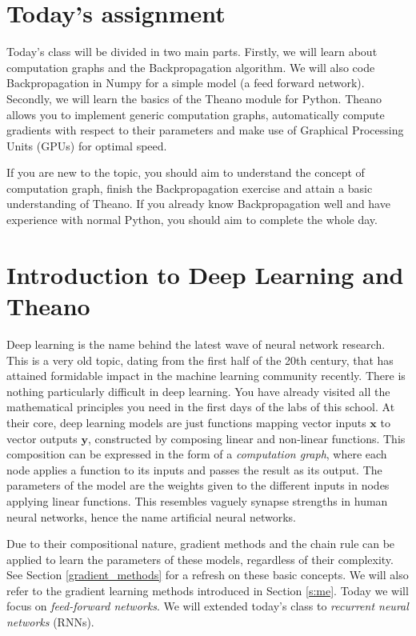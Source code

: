 \section{Today's assignment}
Today's class will be divided in two main parts. Firstly, we will learn about
computation graphs and the Backpropagation algorithm. We will also code
Backpropagation in Numpy for a simple model (a feed forward network). Secondly,
we will learn the basics of the Theano module for Python. Theano allows you to
implement  generic computation graphs, automatically compute gradients with
respect to their parameters and make use of Graphical Processing Units (GPUs)
for optimal speed. 

If you are new to the topic, you should aim to understand the concept of computation graph, 
finish the Backpropagation exercise and attain a basic understanding of Theano.
If you already know Backpropagation well and have experience with normal
Python, you should aim to complete the whole day. 

\section{Introduction to Deep Learning and Theano}

Deep learning is the name behind the latest wave of neural network research.
This is a very old topic, dating from the first half of the 20th century, that
has attained formidable impact in the machine learning community recently. 
There is nothing particularly difficult in deep learning. You have already
visited all the mathematical principles you need in the first days of the
labs of this school. At their core, deep learning models are just functions
mapping vector inputs $\mathbf{x}$ to vector outputs $\mathbf{y}$, constructed by
composing linear and non-linear functions. This composition can be expressed in
the form of a \textit{computation graph}, where each node applies a function to
its inputs and passes the result as its output. The parameters of the model are
the weights given to the different inputs in nodes applying linear
functions. This resembles vaguely synapse strengths in human neural networks,
hence the name artificial neural networks. 

Due to their compositional nature, gradient methods and the chain rule can be
applied to learn the parameters of these models, regardless of their complexity.
See Section \ref{gradient_methods} for a refresh on these basic concepts. We
will also refer to the gradient learning methods introduced in Section
\ref{s:me}. Today we will focus on \textit{feed-forward networks}. We will
extended today's class to \textit{recurrent neural networks} (RNNs).  

